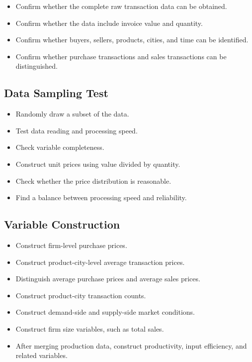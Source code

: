 \documentclass[11pt,a4paper]{article}
\begin{document}
\begin{itemize}
    \item Confirm whether the complete raw transaction data can be obtained.
    \item Confirm whether the data include invoice value and quantity.
    \item Confirm whether buyers, sellers, products, cities, and time can be identified.
    \item Confirm whether purchase transactions and sales transactions can be distinguished.
\end{itemize}

\subsection{Data Sampling Test}

\begin{itemize}
    \item Randomly draw a subset of the data.
    \item Test data reading and processing speed.
    \item Check variable completeness.
    \item Construct unit prices using value divided by quantity.
    \item Check whether the price distribution is reasonable.
    \item Find a balance between processing speed and reliability.
\end{itemize}

\subsection{Variable Construction}

\begin{itemize}
    \item Construct firm-level purchase prices.
    \item Construct product-city-level average transaction prices.
    \item Distinguish average purchase prices and average sales prices.
    \item Construct product-city transaction counts.
    \item Construct demand-side and supply-side market conditions.
    \item Construct firm size variables, such as total sales.
    \item After merging production data, construct productivity, input efficiency, and related variables.
\end{itemize}
\end{document}
